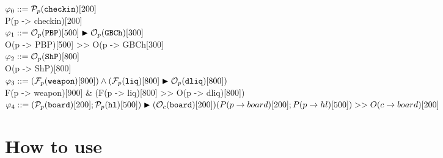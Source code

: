 \documentclass{article}
\begin{document}
\small
    $\varphi_0 ::= {\mathcal{P}_{p}(\mathtt{checkin})}[200]$\\
    P(p -> checkin)[200] \\
    $\varphi_1 ::= {\mathcal{O}_{p}(\mathtt{PBP})}[500]\blacktriangleright {\mathcal{O}_{p}(\ensuremath{\mathtt{GBCh}})}[300]$\\
    O(p -> PBP)[500] >> O(p -> GBCh[300] \\
    $\varphi_2 ::= {\mathcal{O}_{p}(\mathtt{ShP})}[800]$\\
    O(p -> ShP)[800] \\
    $\varphi_3  ::= 
        ({\mathcal{F}_{p}(\mathtt{weapon})}[900]) \wedge \\
            ({\mathcal{F}_{p}(\mathtt{liq})}[800] \blacktriangleright {\mathcal{O}_{p}(\ensuremath{\mathtt{dliq}})}[800])$\\
    F(p -> weapon)[900] \& (F(p -> liq)[800] >> O(p -> dliq)[800]) \\ 
    $\varphi_4 ::= ({\mathcal{P}_{p}(\mathtt{board})}[200] ; {\mathcal{P}_{p}(\mathtt{hl})}[500]) \blacktriangleright ({\mathcal{O}_{c}(\mathtt{board})}[200]) \\ (P(p -> board)[200] ; P(p -> hl)[500]) >> O(c -> board)[200]$
    \\
\normalsize


\section{How to use}
\end{document}
